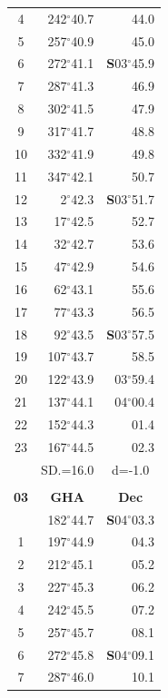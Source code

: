 \documentclass[10pt, a4paper]{report}
\begin{document}
\begin{scriptsize}
\begin{tabular*}{0.2\textwidth}[t]{@{\extracolsep{\fill}}|c|rr|}
4 & 242$^\circ$40.7 & 44.0\\
5 & 257$^\circ$40.9 & 45.0\\[2Pt]
6 & 272$^\circ$41.1 & \textbf{S}03$^\circ$45.9\\
7 & 287$^\circ$41.3 & 46.9\\
8 & 302$^\circ$41.5 & 47.9\\
9 & 317$^\circ$41.7 & \raisebox{0.24ex}{\boldmath$\cdot$~\boldmath$\cdot$~~}48.8\\
10 & 332$^\circ$41.9 & 49.8\\
11 & 347$^\circ$42.1 & 50.7\\[2Pt]
12 & 2$^\circ$42.3 & \textbf{S}03$^\circ$51.7\\
13 & 17$^\circ$42.5 & 52.7\\
14 & 32$^\circ$42.7 & 53.6\\
15 & 47$^\circ$42.9 & \raisebox{0.24ex}{\boldmath$\cdot$~\boldmath$\cdot$~~}54.6\\
16 & 62$^\circ$43.1 & 55.6\\
17 & 77$^\circ$43.3 & 56.5\\[2Pt]
18 & 92$^\circ$43.5 & \textbf{S}03$^\circ$57.5\\
19 & 107$^\circ$43.7 & 58.5\\
20 & 122$^\circ$43.9 & 03$^\circ$59.4\\
21 & 137$^\circ$44.1 & 04$^\circ$00.4\\
22 & 152$^\circ$44.3 & 01.4\\
23 & 167$^\circ$44.5 & 02.3\\
\hline
\rule{0pt}{2.4ex} & \multicolumn{1}{c}{SD.=16.0} & \multicolumn{1}{c|}{d=-1.0}\\
\hline
\multicolumn{1}{c}{}\\[-0.5ex]\hline
\multicolumn{1}{|c|}{\rule{0pt}{2.6ex}\textbf{03}} & \multicolumn{1}{c}{\textbf{GHA}} & \multicolumn{1}{c|}{\textbf{Dec}}\\
\hline\rule{0pt}{2.6ex}\noindent
0 & 182$^\circ$44.7 & \textbf{S}04$^\circ$03.3\\
1 & 197$^\circ$44.9 & 04.3\\
2 & 212$^\circ$45.1 & 05.2\\
3 & 227$^\circ$45.3 & \raisebox{0.24ex}{\boldmath$\cdot$~\boldmath$\cdot$~~}06.2\\
4 & 242$^\circ$45.5 & 07.2\\
5 & 257$^\circ$45.7 & 08.1\\[2Pt]
6 & 272$^\circ$45.8 & \textbf{S}04$^\circ$09.1\\
7 & 287$^\circ$46.0 & 10.1\\

\end{tabular*}
\end{scriptsize}
\end{document}
